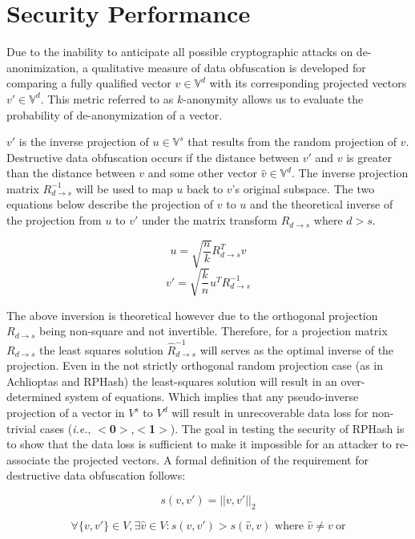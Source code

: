 \section{Security Performance}

Due to the inability to anticipate all possible cryptographic attacks on de-anonimization, a
qualitative measure of data obfuscation is developed for comparing a fully qualified vector $v\in
\mathbb{V}^d$ with its corresponding projected vectors $v'\in \mathbb{V}^d$.  This metric referred to
as $k$-anonymity allows us to evaluate the probability of de-anonymization of a vector.

$v'$ is the inverse projection of $u\in \mathbb{V}^s$ that results from the random projection of
$v$.  Destructive data obfuscation occurs if the distance between $v'$ and $v$ is greater than the
distance between $v$ and some other vector $\hat{v}\in \mathbb{V}^d$.  The inverse projection matrix
$R_{d\rightarrow s}^{-1}$ will be used to map $u$ back to $v$'s original subspace.  The two
equations below describe the projection of $v$ to $u$ and the theoretical inverse of the projection
from $u$ to $v'$ under the matrix transform $R_{d\rightarrow s}$ where $d>s$.

$$ u = \sqrt{{\frac{n}{k}}}R_{d\rightarrow s}^Tv $$
$$ v' = \sqrt{{\frac{k}{n}}}u^T R_{d\rightarrow s}^{-1} $$

The above inversion is theoretical however due to the orthogonal projection $R_{d\rightarrow s}$
being non-square and not invertible.  Therefore, for a projection matrix $R_{d\rightarrow s}$ the
least squares solution $\hat{R}_{d\rightarrow s}^{-1}$ will serves as the optimal inverse of the
projection.  Even in the not strictly orthogonal random projection case (as in Achlioptas
\cite{Achlioptas01} and \textsf{RPHash}) the least-squares solution will result in an over-determined
system of equations.  Which implies that any pseudo-inverse projection of a vector in $V^s$ to $V^d$
will result in unrecoverable data loss for non-trivial cases (\emph{i.e.},
$<$\textbf{0}$>$,$<$\textbf{1}$>$).  The goal in testing the security of \textsf{RPHash} is to show
that the data loss is sufficient to make it impossible for an attacker to re-associate the projected
vectors.  A formal definition of the requirement for destructive data obfuscation follows:

$$
s(v,v') = ||v,v'||_{2} 
$$

$$
\forall\{v,v'\} \in V , \exists {\hat{v}} \in V : s(v,v')>s(\hat{v},v) \text{ where }
\hat{v}\neq v ~ \textrm{or} 
$$

